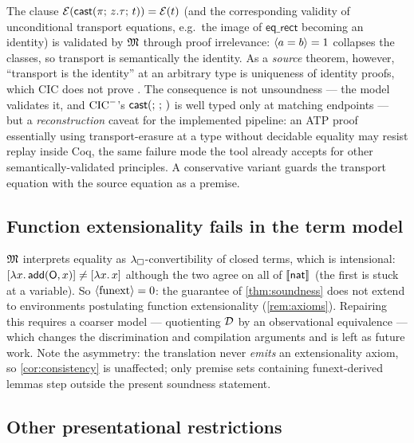 The clause $\mathcal{E}(\mathsf{cast}(\pi;\,z.\tau;\,t)) = \mathcal{E}(t)$ (and the
corresponding validity of unconditional transport equations, e.g.\ the
image of $\mathsf{eq\_rect}$ becoming an identity) is validated by $\mathfrak{M}$
through proof irrelevance: $\langle a = b \rangle = 1$ collapses the classes, so
transport is semantically the identity.  As a \emph{source} theorem,
however, ``transport is the identity'' at an arbitrary type is
uniqueness of identity proofs, which CIC does not prove
\cite{GilbertEtAl2019}.  The consequence is not unsoundness --- the
model validates it, and $\mathrm{CIC}^{-}$'s $\mathsf{cast}(;\,;\,)$ is well typed only at
matching endpoints --- but a \emph{reconstruction} caveat for the
implemented pipeline: an ATP proof essentially using transport-erasure
at a type without decidable equality may resist replay inside Coq, the
same failure mode the tool already accepts for other
semantically-validated principles.  A conservative variant guards the
transport equation with the source equation as a premise.

\subsection{Function extensionality fails in the term model}
\label{sec:limitations-funext}

$\mathfrak{M}$ interprets equality as $\lambda_{\square}$-convertibility of closed terms,
which is intensional: $[\lambda x.\,\mathsf{add}(\mathsf{O}, x)] \neq
[\lambda x.\,x]$ although the two agree on all of $[\![ \mathsf{nat} ]\!]_{}$
(the first is stuck at a variable).  So $\langle \text{funext} \rangle = 0$: the
guarantee of \cref{thm:soundness} does not extend to environments
postulating function extensionality (\cref{rem:axioms}).  Repairing
this requires a coarser model --- quotienting $\mathcal{D}$ by an
observational equivalence --- which changes the discrimination and
compilation arguments and is left as future work.  Note the asymmetry:
the translation never \emph{emits} an extensionality axiom, so
\cref{cor:consistency} is unaffected; only premise sets containing
funext-derived lemmas step outside the present soundness statement.

\subsection{Other presentational restrictions}
\label{sec:limitations-misc}

